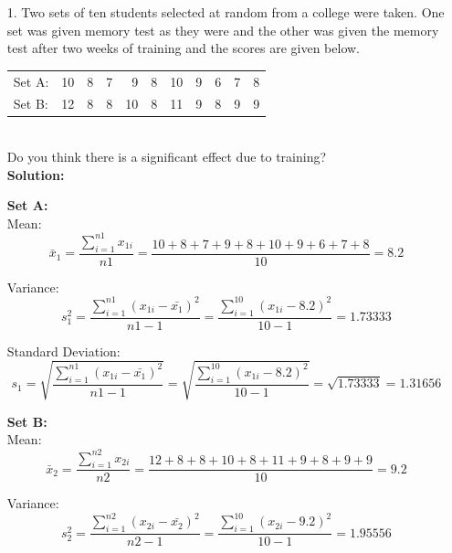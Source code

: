 \documentclass[a4paper,11pt,openright]{report}
\begin{document}
\begin{enumerate}

\item[1.] Two sets of ten students selected at random from a college were taken. One set was
given memory test as they were and the other was given the memory test after two weeks of
training and the scores are given below. \\
\begin{tabular}{lrrrrrrrrrr}
Set A: & 10 & 8 & 7 & 9 & 8 & 10 & 9 & 6 & 7 & 8 \\ 
Set B: & 12 & 8 & 8 & 10 & 8 & 11 & 9 & 8 & 9 & 9 \\
\end{tabular} \\
Do you think there is a significant effect due to training? \\

\textbf{Solution:}

\textbf{Set A:} \\ 
\hspace*{10mm} Mean:
\begin{equation*}
\bar x_{1} = \frac{\sum\limits_{i=1}^{n1} x_{1i}}{n1}
    	= \frac{10 + 8 + 7 + 9 + 8 + 10 + 9 + 6 + 7 + 8}{10}
    	= 8.2
\end{equation*}

\hspace*{10mm} Variance:
\begin{equation*}
s_{1}^{2} = \frac{\sum\limits_{i=1}^{n1} (x_{1i} - \bar {x_{1}})^{2}}{n1 - 1}
		= \frac{\sum\limits_{i=1}^{10} (x_{1i} - 8.2)^{2}}{10 -1} = 1.73333
\end{equation*}

\hspace*{10mm} Standard Deviation:
\begin{equation*}
s_{1} = \sqrt{\frac{\sum\limits_{i=1}^{n1} (x_{1i} - \bar {x_{1}})^{2}}{n1 - 1}}
	= \sqrt{\frac{\sum\limits_{i=1}^{10} (x_{1i} - 8.2)^{2}}{10 -1}}
	= \sqrt{1.73333} = 1.31656
\end{equation*}

\textbf{Set B:} \\
\hspace*{10mm} Mean:
\begin{equation*}
\bar x_{2} = \frac{\sum\limits_{i=1}^{n2} x_{2i}}{n2}
	= \frac{12 + 8 + 8 + 10 + 8 + 11 + 9 + 8 + 9 + 9}{10}
	= 9.2
\end{equation*}

\hspace*{10mm} Variance:
\begin{equation*}
s_{2}^{2} = \frac{\sum\limits_{i=1}^{n2} (x_{2i} - \bar {x_{2}})^{2}}{n2 - 1}
= \frac{\sum\limits_{i=1}^{10} (x_{2i} - 9.2)^{2}}{10 -1} = 1.95556
\end{equation*}


\end{enumerate}
\end{document}

